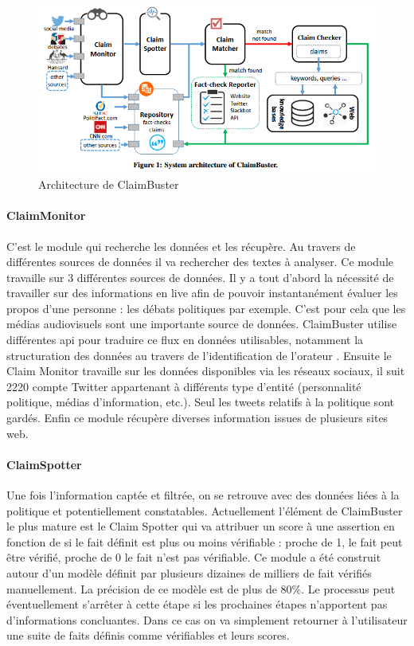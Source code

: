 \documentclass[12pt]{article}
\begin{document}
\begin{figure}[ht]
\centering
\includegraphics[width=\textwidth, draft=false]{imgs/claimbuster.PNG}
\caption{Architecture de ClaimBuster}
\label{fig1}
\end{figure}

\paragraph{ClaimMonitor}

C'est le module qui recherche les données et les récupère. Au travers de différentes sources de données il va rechercher des textes à analyser. Ce module travaille sur 3 différentes sources de données. Il y a tout d'abord la nécessité de travailler sur des informations en live afin de pouvoir instantanément évaluer les propos d'une personne : les débats politiques par exemple. C'est pour cela que les médias audiovisuels sont une importante source de données. ClaimBuster utilise différentes api pour traduire ce flux en données utilisables, notamment la structuration des données au travers de l'identification de l'orateur \cite{joseph2015speaker}. Ensuite le Claim Monitor travaille sur les données disponibles via les réseaux sociaux, il suit 2220 compte Twitter appartenant à différents type d'entité (personnalité politique, médias d'information, etc.). Seul les tweets relatifs à la politique sont gardés. Enfin ce module récupère diverses information issues de plusieurs sites web.

\paragraph{ClaimSpotter}

Une fois l'information captée et filtrée, on se retrouve avec des données liées à la politique et potentiellement constatables. Actuellement l'élément de ClaimBuster le plus mature est le Claim Spotter qui va attribuer un score à une assertion en fonction de si le fait définit est plus ou moins vérifiable : proche de 1, le fait peut être vérifié, proche de 0 le fait n'est pas vérifiable. Ce module a été construit autour d'un modèle définit par plusieurs dizaines de milliers de fait vérifiés manuellement. La précision de ce modèle est de plus de 80\%.  Le processus peut éventuellement s'arrêter à cette étape si les prochaines étapes n'apportent pas d'informations concluantes. Dans ce cas on va simplement retourner à l'utilisateur une suite de faits définis comme vérifiables et leurs scores.
\end{document}
